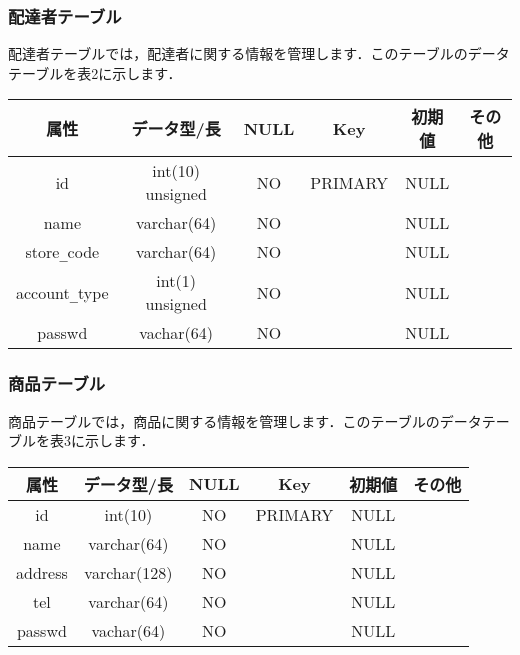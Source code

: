 \documentclass[a4j,titlepage]{jarticle}
\begin{document}
\subsubsection{配達者テーブル}
配達者テーブルでは，配達者に関する情報を管理します．このテーブルのデータテーブルを表2に示します．
\begin{table}[htb]
  \begin{center}
    \begin{tabular}{|c|c|c|c|c|c|} \hline
      属性 & データ型/長 & NULL & Key & 初期値 & その他 \\ \hline \hline
      id & int(10) unsigned & NO & PRIMARY & NULL & \\ \hline
      name & varchar(64) & NO &   & NULL & \\ \hline
      store\verb|_|code & varchar(64) & NO &   & NULL & \\ \hline
      account\verb|_|type & int(1) unsigned & NO &   & NULL & \\ \hline
      passwd & vachar(64) & NO &   & NULL & \\ \hline
    \end{tabular}
  \end{center}
\end{table}

\subsubsection{商品テーブル}
商品テーブルでは，商品に関する情報を管理します．このテーブルのデータテーブルを表3に示します．
\begin{table}[htb]
  \begin{center}
    \begin{tabular}{|c|c|c|c|c|c|} \hline
      属性 & データ型/長 & NULL & Key & 初期値 & その他 \\ \hline \hline
      id & int(10) & NO & PRIMARY & NULL & \\ \hline
      name & varchar(64) & NO &   & NULL & \\ \hline
      address & varchar(128) & NO &   & NULL & \\ \hline
      tel & varchar(64) & NO &   & NULL & \\ \hline
      passwd & vachar(64) & NO &   & NULL & \\ \hline
    \end{tabular}
  \end{center}
\end{table}
\end{document}
